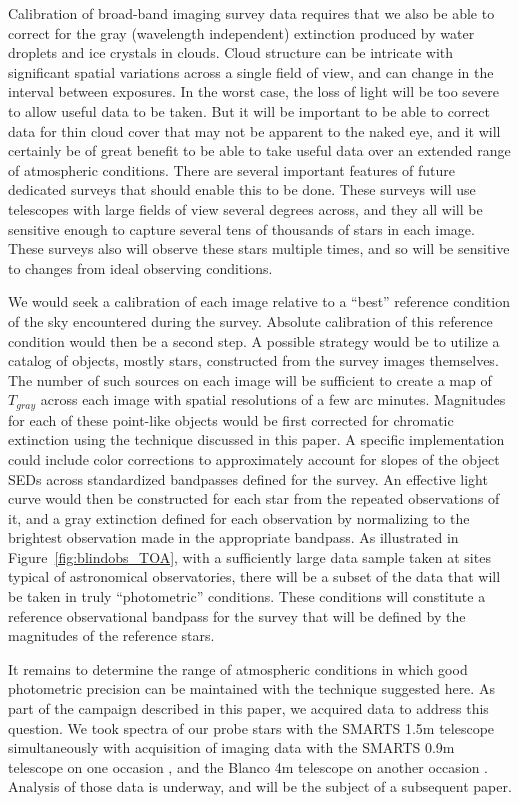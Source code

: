 \documentclass[manuscript]{aastex}
\begin{document}
Calibration of broad-band imaging survey data requires that we also be able to correct for
the gray (wavelength independent) extinction produced by water droplets and ice crystals in clouds.
Cloud structure can be intricate with significant spatial variations across a single field of view,
and can change in the interval between exposures.
In the worst case, the loss of light will be too severe to allow useful data to be taken.
But it will be important to be able to correct data for thin cloud cover that may not be apparent to the naked eye,
and it will certainly be of great benefit to be able to take useful data over an extended range of atmospheric conditions. 
There are several important features of future dedicated surveys that should enable this to be done.
These surveys will use telescopes with large fields of view several degrees across,
and they all will be sensitive enough to capture several tens of thousands of stars in each image.
These surveys also will observe these stars multiple times, and so will be sensitive to changes from ideal observing conditions. 

We would seek a calibration of each image relative to a ``best'' reference condition of the sky encountered during the survey.
Absolute calibration of this reference condition would then be a second step.
A possible strategy would be to utilize a catalog of objects, mostly stars, constructed from the survey images themselves.
The number of such sources on each image will be sufficient to create a map of $T_{gray}$ across each image with spatial resolutions of a few arc minutes.
Magnitudes for each of these point-like objects would be first corrected for chromatic extinction using the technique discussed in this paper.
A specific implementation could include color corrections to approximately account for slopes of the object SEDs across standardized bandpasses defined
for the survey.
An effective light curve would then be constructed for each star from the repeated observations of it,
and a gray extinction defined for each observation by normalizing to the brightest observation made in the appropriate bandpass.
As illustrated in Figure~\ref{fig:blindobs_TOA}, with a sufficiently large data sample taken at sites typical of astronomical observatories, 
there will be a subset of the data that will be taken in truly ``photometric'' conditions.
These conditions will constitute a reference observational bandpass for the survey that will be defined by the magnitudes of the reference stars.

It remains to determine the range of atmospheric conditions in which good photometric precision can be maintained with the technique suggested here.
As part of the campaign described in this paper, we acquired data to address this question.
We took spectra of our probe stars with the SMARTS 1.5m telescope simultaneously with acquisition of
imaging data with the SMARTS 0.9m telescope on one occasion \cite{CTIO08A},
and the Blanco 4m telescope on another occasion \cite{CTIO09A}.
Analysis of those data is underway, and will be the subject of a subsequent paper.
\end{document}
